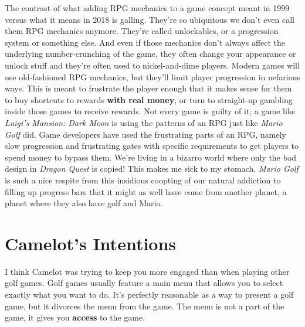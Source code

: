\documentclass{book}
\begin{document}
The contrast of what adding RPG mechanics to a game concept meant in 1999 versus what it means in 2018 is galling. They’re so ubiquitous we don’t even call them RPG mechanics anymore. They’re called unlockables, or a progression system or something else. And even if those mechanics don’t always affect the underlying number-crunching of the game, they often change your appearance or unlock stuff and they’re often used to nickel-and-dime players. Modern games will use old-fashioned RPG mechanics, but they’ll limit player progression in nefarious ways. This is meant to frustrate the player enough that it makes sense for them to buy shortcuts to rewards \textbf{with real money}, or turn to straight-up gambling inside those games to receive rewards. Not every game is guilty of it; a game like \emph{Luigi’s Mansion: Dark Moon} is using the patterns of an RPG just like \emph{Mario Golf} did. Game developers have used the frustrating parts of an RPG, namely slow progression and frustrating gates with specific requirements to get players to spend money to bypass them. We’re living in a bizarro world where only the bad design in \emph{Dragon Quest} is copied! This makes me sick to my stomach. \emph{Mario Golf} is such a nice respite from this insidious coopting of our natural addiction to filling up progress bars that it might as well have come from another planet, a planet where they also have golf and Mario.\par
\FloatBarrier\section*{Camelot’s Intentions}
I think Camelot was trying to keep you more engaged than when playing other golf games. Golf games usually feature a main menu that allows you to select exactly what you want to do. It’s perfectly reasonable as a way to present a golf game, but it divorces the menu from the game. The menu is not a part of the game, it gives you \textbf{access} to the game.\par
\FloatBarrier\vspace{\baselineskip}\centering
\begin{minipage}{0.45\linewidth}\captionsetup{labelformat=empty}\end{minipage}\vspace{2pt}
\begin{minipage}{0.45\linewidth}\captionsetup{labelformat=empty}\end{minipage}
\end{document}
